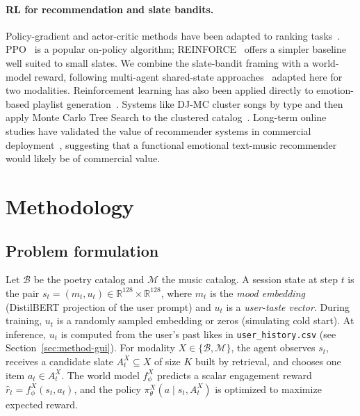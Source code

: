 \documentclass[11pt]{article}
\begin{document}
\paragraph{RL for recommendation and slate bandits.}
Policy-gradient and actor-critic methods have been adapted to ranking
tasks~\cite{chen2019topk,ie2019slateq}. PPO~\cite{schulman2017ppo} is a
popular on-policy algorithm; REINFORCE~\cite{williams1992reinforce}
offers a simpler baseline well suited to small slates. We combine the
slate-bandit framing with a world-model reward, following multi-agent
shared-state approaches~\cite{zou2020massa} adapted here for two
modalities. Reinforcement learning has also been applied directly to
emotion-based playlist generation~\cite{chi2010reinforcement}. Systems
like DJ-MC cluster songs by type and then apply Monte Carlo Tree Search
to the clustered catalog~\cite{liebman2014djmc}. Long-term online
studies have validated the value of recommender systems in commercial
deployment~\cite{shani2005mdp}, suggesting that a functional
emotional text-music recommender would likely be of commercial value.

\section{Methodology}
\label{sec:method}

\subsection{Problem formulation}
\label{sec:method-problem}

Let $\mathcal{B}$ be the poetry catalog and $\mathcal{M}$ the music
catalog. A session state at step $t$ is the pair $s_t = (m_t, u_t) \in
\mathbb{R}^{128} \times \mathbb{R}^{128}$, where $m_t$ is the
\emph{mood embedding} (DistilBERT projection of the user prompt) and
$u_t$ is a \emph{user-taste vector}. During training, $u_t$ is a
randomly sampled embedding or zeros (simulating cold start). At
inference, $u_t$ is computed from the user's past likes in
\texttt{user\_history.csv} (see Section~\ref{sec:method-gui}). For
modality $X \in \{\mathcal{B},\mathcal{M}\}$, the agent observes $s_t$,
receives a candidate slate $A_t^X \subseteq X$ of size $K$ built by
retrieval, and chooses one item $a_t \in A_t^X$. The world model
$f_\phi^X$ predicts a scalar engagement reward $\hat r_t =
f_\phi^X(s_t, a_t)$, and the policy $\pi_\theta^X(a \mid s_t, A_t^X)$
is optimized to maximize expected reward.
\end{document}
